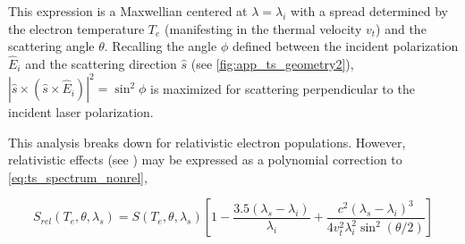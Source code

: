 \noindent This expression is a Maxwellian centered at $\lambda = \lambda_i$ with a spread determined by the electron temperature $T_e$ (manifesting in the thermal velocity $v_t$) and the scattering angle $\theta$.  Recalling the angle $\phi$ defined between the incident polarization $\hat{E}_i$ and the scattering direction $\hat{s}$ (see \cref{fig:app_ts_geometry2}), $\left|\hat{s} \times \left( \hat{s} \times \hat{E}_i \right) \right|^2 = \sin^2 \phi$ is maximized for scattering perpendicular to the incident laser polarization.

This analysis breaks down for relativistic electron populations.  However, relativistic effects (see \cite[\S 9]{Sheffield}) may be expressed as a polynomial correction to \cref{eq:ts_spectrum_nonrel},


\begin{equation}\label{eq:ts_spectrum_rel}
 S_{rel}(T_e,\theta,\lambda_s) = S(T_e,\theta,\lambda_s) \left[ 1 - \frac{3.5(\lambda_s - \lambda_i)}{\lambda_i} + \frac{c^2 (\lambda_s - \lambda_i)^3}{4v_t^2 \lambda_i^2 \sin^2 (\theta/2)}\right]
\end{equation}

\begin{figure}[t]
 \pushtooutside
\end{figure}

